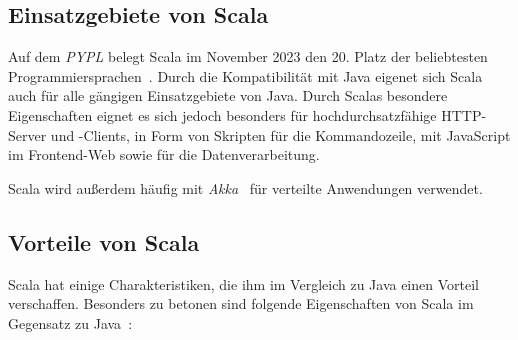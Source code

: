 \subsection{Einsatzgebiete von Scala}
Auf dem \emph{\acf{PYPL}} belegt Scala im November 2023 den 20. Platz der beliebtesten Programmiersprachen~\cite{carbonnelle_pypl_2023}.
Durch die Kompatibilität mit Java eigenet sich Scala auch für alle gängigen Einsatzgebiete von Java. 
Durch Scalas besondere Eigenschaften eignet es sich jedoch besonders für hochdurchsatzfähige HTTP-Server und -Clients, in Form von Skripten für die Kommandozeile, mit JavaScript im Frontend-Web sowie für die Datenverarbeitung.

Scala wird außerdem häufig mit \emph{Akka}~\cite{lightbend_akka_nodate} für verteilte Anwendungen verwendet.

\subsection{Vorteile von Scala}
Scala hat einige Charakteristiken, die ihm im Vergleich zu Java einen Vorteil verschaffen.
Besonders zu betonen sind folgende Eigenschaften von Scala im Gegensatz zu Java~\cite{epfl_scala_nodate-1, epfl_scala_nodate-2}: %

